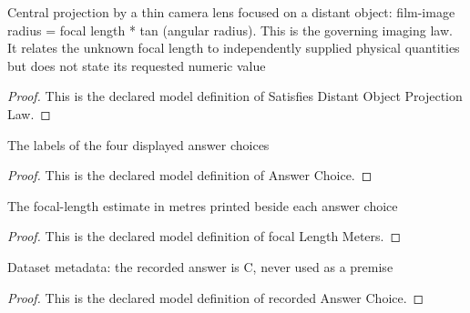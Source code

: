 \begin{definition}
  \label{def:physics:phyx-mini-0153:phyxminiproblems-problemphyxmini0153-satisfiesdistantobjectprojectionlaw}
  Central projection by a thin camera lens focused on a distant object: film-image radius = focal length * tan (angular radius). This is the governing imaging law. It relates the unknown focal length to independently supplied physical quantities but does not state its requested numeric value
\end{definition}
\begin{proof}
  This is the declared model definition of Satisfies Distant Object Projection Law.
\end{proof}
\begin{definition}
  \label{def:physics:phyx-mini-0153:phyxminiproblems-problemphyxmini0153-answerchoice}
  The labels of the four displayed answer choices
\end{definition}
\begin{proof}
  This is the declared model definition of Answer Choice.
\end{proof}
\begin{definition}
  \label{def:physics:phyx-mini-0153:phyxminiproblems-problemphyxmini0153-answerchoice-focallengthmeters}
  The focal-length estimate in metres printed beside each answer choice
\end{definition}
\begin{proof}
  This is the declared model definition of focal Length Meters.
\end{proof}
\begin{definition}
  \label{def:physics:phyx-mini-0153:phyxminiproblems-problemphyxmini0153-recordedanswerchoice}
  Dataset metadata: the recorded answer is C, never used as a premise
\end{definition}
\begin{proof}
  This is the declared model definition of recorded Answer Choice.
\end{proof}
